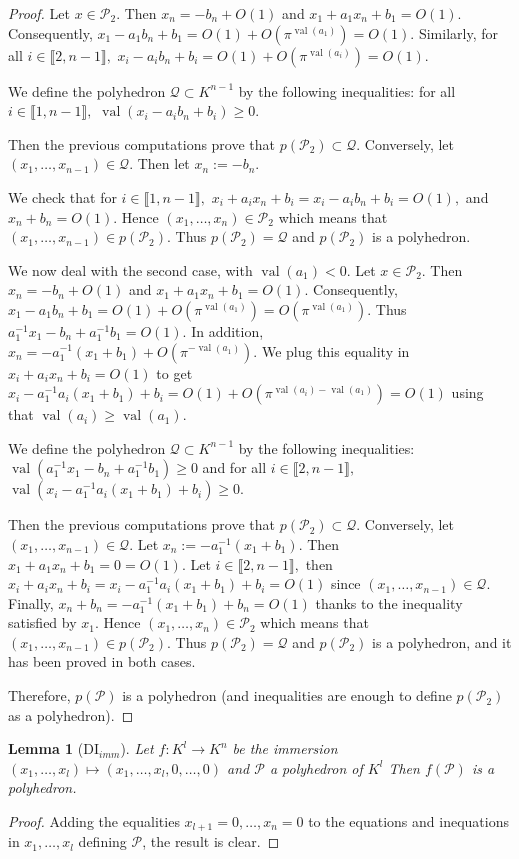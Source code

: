 \documentclass[a4paper,oneside,10pt]{article}
\newtheorem{lemma}[theorem]{Lemma}
\newcommand{\PP}{\mathcal{P}}
\newcommand{\Qc}{\mathcal{Q}}
\DeclareMathOperator{\val}{val}
\begin{document}
\begin{proof}
Let $x \in \PP_2$.
Then $x_n=-b_n+O(1)$
and $x_1+a_1 x_n+b_1=O(1).$
Consequently, $x_1-a_1 b_n +b_1=O(1)+O(\pi^{\val(a_1)})=O(1).$
Similarly, for all $i \in \llbracket 2,n-1 \rrbracket,$
$x_i-a_ib_n+b_i=O(1)+O(\pi^{\val(a_i)})=O(1).$

We define the polyhedron $\Qc \subset K^{n-1}$ by the following inequalities:
 for all $i \in \llbracket 1,n-1 \rrbracket,$
$\val(x_i-a_ib_n+b_i) \geq 0$.

Then the previous computations prove that $p(\PP_2)\subset \Qc.$
Conversely, let $(x_1,\dots,x_{n-1}) \in \Qc.$
Then let $x_n := -b_n.$

We check that for $i \in \llbracket 1,n-1 \rrbracket,$
$x_i+a_ix_n+b_i=x_i-a_ib_n+b_i=O(1),$
and $x_n+b_n=O(1)$. Hence $(x_1,\dots,x_n) \in \PP_2$
which means that $(x_1,\dots,x_{n-1}) \in p(\PP_2).$
Thus $p(\PP_2)= \Qc$ and $p(\PP_2)$ is a polyhedron.

We now deal with the second case, with $\val(a_1)<0.$
Let $x \in \PP_2$.
Then $x_n=-b_n+O(1)$
and $x_1+a_1 x_n+b_1=O(1).$
Consequently, $x_1-a_1 b_n +b_1=O(1)+O(\pi^{\val(a_1)})=O(\pi^{\val(a_1)}).$
Thus $a_1^{-1}x_1- b_n +a_1^{-1}b_1=O(1)$.
In addition, $x_n=-a_1^{-1}(x_1+b_1)+O(\pi^{-\val(a_1)}).$
We plug this equality in 
$x_i+a_i x_n+b_i=O(1)$ to get
$x_i-a_1^{-1}a_i(x_1+b_1)+b_i=O(1)+O(\pi^{\val(a_i)-\val(a_1)})=O(1)$
using that $\val(a_i) \geq \val (a_1).$

We define the polyhedron $\Qc \subset K^{n-1}$ by the following inequalities:
$\val(a_1^{-1}x_1- b_n +a_1^{-1}b_1) \geq 0$ and for all $i \in \llbracket 2,n-1 \rrbracket,$
$\val(x_i-a_1^{-1}a_i(x_1+b_1)+b_i) \geq 0.$

Then the previous computations prove that $p(\PP_2)\subset \Qc.$
Conversely, let $(x_1,\dots,x_{n-1}) \in \Qc.$
Let $x_n := -a_1^{-1}(x_1+b_1).$
Then
$x_1+a_1 x_n+b_1=0=O(1).$
Let $i \in \llbracket 2,n-1 \rrbracket,$
then $x_i+a_i x_n+b_i=x_i-a_1^{-1}a_i(x_1+b_1)+b_i=O(1)$
since $(x_1,\dots,x_{n-1}) \in \Qc.$
Finally, 
$x_n+b_n=-a_1^{-1}(x_1+b_1)+b_n=O(1)$ thanks to the inequality satisfied by $x_1.$
Hence $(x_1,\dots,x_n) \in \PP_2$
which means that $(x_1,\dots,x_{n-1}) \in p(\PP_2).$
Thus $p(\PP_2)= \Qc$ and $p(\PP_2)$ is a polyhedron,
and it has been proved in both cases.

Therefore, $p(\PP)$ is a polyhedron (and inequalities are enough to define $p(\PP_2)$ as a polyhedron).
\end{proof}

\begin{lemma}[DI${}_{imm}$]
Let $f : K^l \to K^n$ be the immersion $(x_1,\dots, x_l) \mapsto (x_1,\dots, x_l,0,\dots, 0)$ and $\PP$ a polyhedron of $K^l$
Then $f(\PP)$ is a polyhedron. \label{lem:DIimm}
\end{lemma}
\begin{proof}
Adding the equalities $x_{l+1}=0, \dots, x_n=0$ to the equations and inequations in
$x_1,\dots, x_l$ defining $\PP$, the result is clear.
\end{proof}
\end{document}
